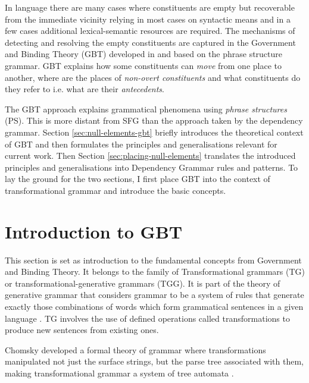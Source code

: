 In language there are many cases where constituents are empty but recoverable from the immediate vicinity relying in most cases on syntactic means and in a few cases additional lexical-semantic resources are required. The mechanisms of detecting and resolving the empty constituents are captured in the Government and Binding Theory (GBT) developed in \citep{Chomsky81, Chomsky1982, Chomsky1986} and based on the phrase structure grammar. GBT explains how some constituents can \textit{move} from one place to another, where are the places of \textit{non-overt constituents} and what constituents do they refer to i.e. what are their \textit{antecedents}. 

The GBT approach explains grammatical phenomena using \textit{phrase structures} (PS). This is more distant from SFG than the approach taken by the dependency grammar. Section \ref{sec:null-elements-gbt} briefly introduces the theoretical context of GBT and then formulates the principles and generalisations relevant for current work. Then Section \ref{sec:placing-null-elements} translates the introduced principles and generalisations into Dependency Grammar rules and patterns. To lay the ground for the two sections, I first place GBT into the context of transformational grammar and introduce the basic concepts.

\section{Introduction to GBT}
\label{sec:phrase-structure}

This section is set as introduction to the fundamental concepts from Government and Binding Theory. It belongs to the family of Transformational grammars (TG) or transformational-generative grammars (TGG). It is part of the theory of generative grammar that considers grammar to be a system of rules that generate exactly those combinations of words which form grammatical sentences in a given language \citep{Chomsky65}. TG involves the use of defined operations called transformations to produce new sentences from existing ones.

Chomsky developed a formal theory of grammar \citep{Chomsky56} where transformations manipulated not just the surface strings, but the parse tree associated with them, making transformational grammar a system of tree automata \citep{Stockwell1973}.

